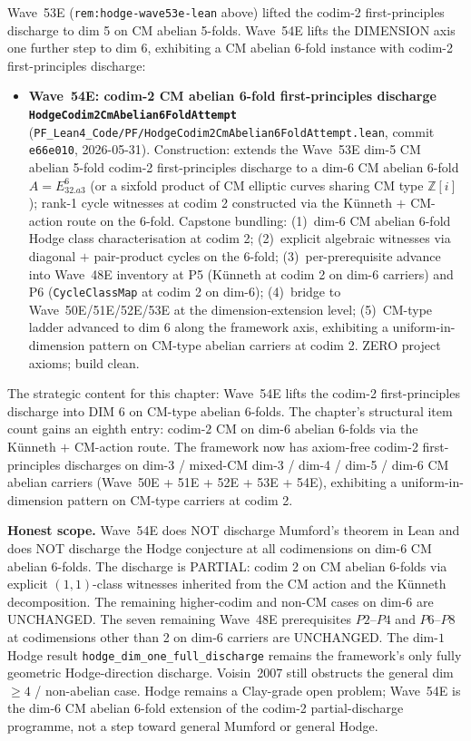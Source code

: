 \begin{remark}\label{rem:hodge-wave54e-lean}
Wave~53E (\texttt{rem:hodge-wave53e-lean} above) lifted the codim-2 first-principles discharge to dim 5 on CM abelian 5-folds. Wave~54E lifts the DIMENSION axis one further step to dim 6, exhibiting a CM abelian 6-fold instance with codim-2 first-principles discharge:
\begin{itemize}
  \item \textbf{Wave~54E: codim-2 CM abelian 6-fold first-principles discharge \texttt{HodgeCodim2CmAbelian6FoldAttempt}} (\texttt{PF\_Lean4\_Code/PF/HodgeCodim2CmAbelian6FoldAttempt.lean}, commit \texttt{e66e010}, 2026-05-31). Construction: extends the Wave~53E dim-5 CM abelian 5-fold codim-2 first-principles discharge to a dim-6 CM abelian 6-fold $A = E_{32.a3}^6$ (or a sixfold product of CM elliptic curves sharing CM type $\mathbb{Z}[i]$); rank-1 cycle witnesses at codim 2 constructed via the K\"unneth $+$ CM-action route on the 6-fold. Capstone bundling: (1)~dim-6 CM abelian 6-fold Hodge class characterisation at codim 2; (2)~explicit algebraic witnesses via diagonal $+$ pair-product cycles on the 6-fold; (3)~per-prerequisite advance into Wave~48E inventory at P5 (K\"unneth at codim 2 on dim-6 carriers) and P6 (\texttt{CycleClassMap} at codim 2 on dim-6); (4)~bridge to Wave~50E/51E/52E/53E at the dimension-extension level; (5)~CM-type ladder advanced to dim 6 along the framework axis, exhibiting a uniform-in-dimension pattern on CM-type abelian carriers at codim 2. ZERO project axioms; build clean.
\end{itemize}
The strategic content for this chapter: Wave~54E lifts the codim-2 first-principles discharge into DIM 6 on CM-type abelian 6-folds. The chapter's structural item count gains an eighth entry: codim-$2$ CM on dim-6 abelian 6-folds via the K\"unneth $+$ CM-action route. The framework now has axiom-free codim-2 first-principles discharges on dim-3 / mixed-CM dim-3 / dim-4 / dim-5 / dim-6 CM abelian carriers (Wave~50E + 51E + 52E + 53E + 54E), exhibiting a uniform-in-dimension pattern on CM-type carriers at codim 2.

\textbf{Honest scope.} Wave~54E does NOT discharge Mumford's theorem in Lean and does NOT discharge the Hodge conjecture at all codimensions on dim-6 CM abelian 6-folds. The discharge is PARTIAL: codim 2 on CM abelian 6-folds via explicit $(1, 1)$-class witnesses inherited from the CM action and the K\"unneth decomposition. The remaining higher-codim and non-CM cases on dim-6 are UNCHANGED. The seven remaining Wave~48E prerequisites $P2$--$P4$ and $P6$--$P8$ at codimensions other than 2 on dim-6 carriers are UNCHANGED. The dim-$1$ Hodge result \texttt{hodge\_dim\_one\_full\_discharge} remains the framework's only fully geometric Hodge-direction discharge. Voisin~2007 still obstructs the general dim~$\geq 4$ / non-abelian case. Hodge remains a Clay-grade open problem; Wave~54E is the dim-6 CM abelian 6-fold extension of the codim-2 partial-discharge programme, not a step toward general Mumford or general Hodge.
\end{remark}

